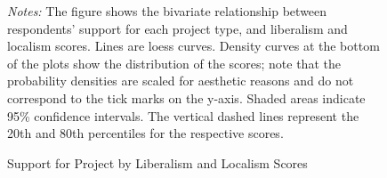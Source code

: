 \documentclass[article,11pt]{memoir}
\begin{document}

\begin{figure}[tb]\centering
  \caption{Support for Project by Liberalism and Localism Scores}
  \label{fig:e_lib_loc}
  \begin{measuredfigure}
  \end{measuredfigure}
  \begin{tablenotes}[flushleft]
    \item \hspace{-.2em}\emph{Notes:} The figure shows the bivariate relationship between respondents' support for each project type, and liberalism and localism scores. Lines are loess curves.  Density curves at the bottom of the plots show the distribution of the scores; note that the probability densities are scaled for aesthetic reasons and do not correspond to the tick marks on the y-axis. Shaded areas indicate 95\% confidence intervals. The vertical dashed lines represent the 20th and 80th percentiles for the respective scores.
  \end{tablenotes}
\end{figure}
\end{document}
